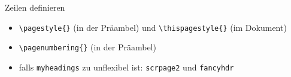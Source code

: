 \begin{frame}[fragile]{Zeilen definieren}
    \begin{itemize}
        \item \lstinline|\pagestyle{}| (in der Präambel) und \lstinline|\thispagestyle{}| (im Dokument)
        \item \lstinline|\pagenumbering{}| (in der Präambel)
        \item falls \texttt{myheadings} zu unflexibel ist: \texttt{scrpage2} und \texttt{fancyhdr}
    \end{itemize}
\end{frame}

